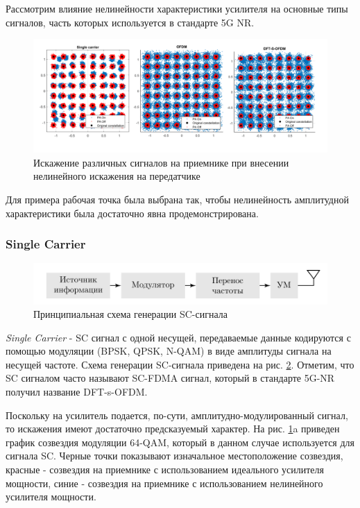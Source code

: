 
Рассмотрим влияние нелинейности характеристики усилителя на основные типы
сигналов, часть которых используется в стандарте 5G NR.

\begin{figure}[h!]
    \centering
    \includegraphics[width=0.95\linewidth]{figs/ofdm_pa_distortions.png}
    \caption{Искажение различных сигналов на приемнике при внесении нелинейного
    искажения на передатчике}
    \label{fig:lls_rapp_distortions_0}
\end{figure}

Для примера рабочая точка была выбрана так, чтобы нелинейность
амплитудной характеристики была достаточно явна продемонстрирована.
\subsubsection{Single Carrier}
\begin{figure}[h!]
    \centering
    \includegraphics[scale=1]{figs/sc_scheme.pdf}
    \caption{Принципиальная схема генерации SC-сигнала}
    \label{fig:sc_scheme}
\end{figure}
\textit{Single Carrier} - SC сигнал с одной несущей, передаваемые данные
кодируются с помощью модуляции (BPSK, QPSK, N-QAM) в виде амплитуды сигнала
на несущей частоте. Схема генерации SC-сигнала приведена на рис.
\ref{fig:sc_scheme}. Отметим, что SC сигналом часто называют SC-FDMA
сигнал, который в стандарте 5G-NR получил название DFT-s-OFDM.

Поскольку на усилитель подается, по-сути, амплитудно-модулированный сигнал,
то искажения имеют достаточно предсказуемый характер. На рис.
\ref{fig:lls_rapp_distortions_0}a приведен график созвездия модуляции
64-QAM, который в данном случае используется для сигнала SC. Черные точки
показывают изначальное местоположение созвездия, красные - созвездия на
приемнике с использованием идеального усилителя мощности, синие - созвездия
на приемнике с использованием нелинейного усилителя мощности. 

